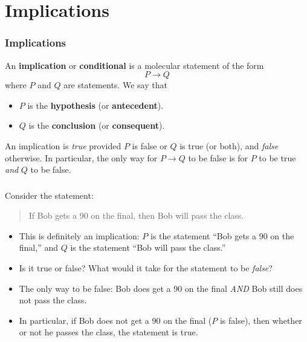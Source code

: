 \documentclass[11pt, compress]{beamer}
\newcommand{\terminology}[1]{\textbf{#1}}\newcommand{\lt}{<}
\newcommand{\imp}{\rightarrow}
\begin{document}
\section{Implications}
\begin{frame}
\frametitle{Implications}
 An \terminology{implication} or \terminology{conditional} is a molecular statement of the form%
\begin{equation*}
P \imp Q
\end{equation*}
where \(P\) and \(Q\) are statements. We say that\begin{itemize}
\item{} \(P\) is the \terminology{hypothesis} (or \terminology{antecedent}).

\item{} \(Q\) is the \terminology{conclusion} (or \terminology{consequent}).
\end{itemize}

 An implication is \emph{true} provided \(P\) is false or \(Q\) is true (or both), and \emph{false} otherwise. In particular, the only way for \(P \imp Q\) to be false is for \(P\) to be true \emph{and} \(Q\) to be false.
\end{frame}
 
\begin{frame}
\frametitle{}
\begin{example}[0.2.2]Consider the statement:
\begin{quote}%
If Bob gets a 90 on the final, then Bob will pass the class.
\end{quote}

\pause 

\begin{itemize}[<+->]
\item{} This is definitely an implication: \(P\) is the statement ``Bob gets a 90 on the final,'' and \(Q\) is the statement ``Bob will pass the class.''


\item{} Is it true or false?  What would it take for the statement to be \emph{false}?


\item{} The only way to be false: Bob does get a 90 on the final \emph{AND} Bob still does not pass the class.


\item{} In particular, if Bob does not get a 90 on the final (\(P\) is false), then whether or not he passes the class, the statement is true.

\end{itemize}

\end{example}
\end{frame}
 
\end{document}
